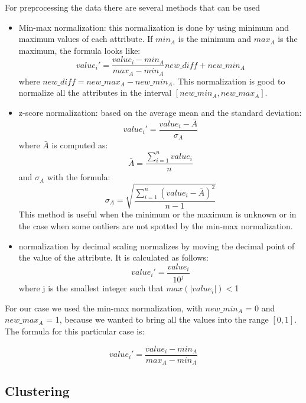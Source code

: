 \documentclass[conference]{IEEEtran}
\begin{document}
For preprocessing the data there are several methods that can be used \cite{Han06DataMining}
\begin{itemize}
	\item Min-max normalization: this normalization is done by using minimum and maximum values of each attribute. If $min_A$ is the minimum and $max_A$ is the maximum, the formula looks like:
		\begin{equation}
			value_i' = \frac{value_i - min_A}{max_A - min_A}new\_diff + new\_min_A
		\end{equation}
		where $new\_diff = new\_max_A - new\_min_A$.
		This normalization is good to normalize all the attributes in the interval $[new\_min_A, new\_max_A]$.
	\item z-score normalization: based on the average mean and the standard deviation:
		\begin{equation}
			value_i' = \frac{value_i - \bar{A}}{\sigma_A}
		\end{equation}
		where $\bar{A}$ is computed as:
		\begin{equation}
			\bar{A} = \frac{\displaystyle\sum_{i=1}^{n} value_i}{n}
		\end{equation}
		and $\sigma_A$ with the formula:
		\begin{equation}
			\sigma_A = \sqrt{\frac{\displaystyle\sum_{i=1}^{n} (value_i - \bar{A})^2}{n-1}}
		\end{equation}
		This method is useful when the minimum or the maximum is unknown or in the case when some outliers are not spotted by the min-max normalization.
	\item normalization by decimal scaling normalizes by moving the decimal point of the value of the attribute. It is calculated as follows:
		\begin{equation}
			value_i' = \frac{value_i}{10^j}
		\end{equation}
		where j is the smallest integer such that $max(|value_i |) < $1

\end{itemize}
For our case we used the min-max normalization, with $new\_min_A$ = 0 and $new\_max_A$ = 1, because we wanted to bring all the values into the range $[0,1]$. The formula for this particular case is:

\begin{equation}
	value_i' = \frac{value_i-min_A}{max_A - min_A}
\end{equation}

\subsection{Clustering}
\end{document}
